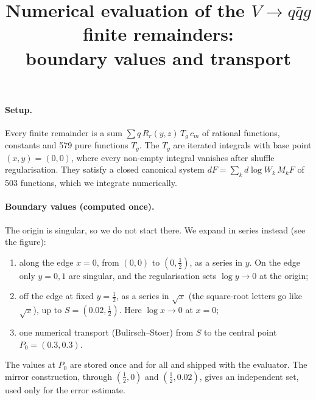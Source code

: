 \documentclass[11pt]{article}
\title{Numerical evaluation of the $V\to q\bar q g$ finite remainders:\\ boundary values and transport}
\date{}
\begin{document}
\maketitle

\paragraph{Setup.}
Every finite remainder is a sum $\sum q\,R_r(y,z)\,T_g\,c_m$ of rational functions, constants and 579 pure functions
$T_g$. The $T_g$ are iterated integrals with base point $(x,y)=(0,0)$, where every non-empty integral vanishes after
shuffle regularisation. They satisfy a closed canonical system $dF=\sum_k d\log W_k\,M_k F$ of 503 functions, which
we integrate numerically.

\paragraph{Boundary values (computed once).}
The origin is singular, so we do not start there. We expand in series instead (see the figure):
\begin{enumerate}
\item along the edge $x=0$, from $(0,0)$ to $(0,\tfrac12)$, as a series in $y$. On the edge only $y=0,1$ are
  singular, and the regularisation sets $\log y\to0$ at the origin;
\item off the edge at fixed $y=\tfrac12$, as a series in $\sqrt{x}$ (the square-root letters go like $\sqrt x$), up to
  $S=(0.02,\tfrac12)$. Here $\log x\to0$ at $x=0$;
\item one numerical transport (Bulirsch--Stoer) from $S$ to the central point $P_0=(0.3,0.3)$.
\end{enumerate}
The values at $P_0$ are stored once and for all and shipped with the evaluator. The mirror construction, through
$(\tfrac12,0)$ and $(\tfrac12,0.02)$, gives an independent set, used only for the error estimate.
\end{document}

